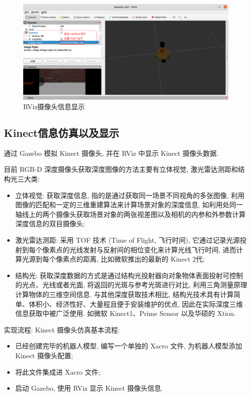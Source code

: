 \documentclass[openany, fontset=windowsold]{ctexbook}
\theoremstyle{kaiti}
\theoremstyle{normal}
\begin{document}
\begin{figure}[!ht]
  \centering
  \includegraphics[width=.9\textwidth]{rviz_show_camera_data.png}
  \caption{RViz摄像头信息显示}
  \label{fig:rviz_show_camera_data}
\end{figure}

\subsection{Kinect信息仿真以及显示}

通过 Gazebo 模拟 Kinect 摄像头, 并在 RViz 中显示 Kinect 摄像头数据.

目前 RGB-D 深度摄像头获取深度图像的方法主要有立体视觉, 激光雷达测距和结构光三大类:

\begin{itemize}
  \item 立体视觉: 获取深度信息, 指的是通过获取同一场景不同视角的多张图像, 利用图像的匹配和一定的三维重建算法来计算场景对象的深度信息, 如利用处同一轴线上的两个摄像头获取场景对象的两张视差图以及相机的内参和外参数计算深度信息的双目摄像头;
  \item 激光雷达测距: 采用 TOF 技术 (Time of Flight, 飞行时间), 它通过记录光源投射到每个像素点的光线发射与反射间的相位变化来计算光线飞行时间, 进而计算光源到每个像素点的距离, 比如微软推出的最新的 Kinect 2代;
  \item 结构光: 获取深度数据的方式是通过结构光投射器向对象物体表面投射可控制的光点、光线或者光面, 将返回的光斑与参考光斑进行对比, 利用三角测量原理计算物体的三维空间信息. 与其他深度获取技术相比, 结构光技术具有计算简单、体积小、经济性好、大量程且便于安装维护的优点, 因此在实际深度三维信息获取中被广泛使用. 如微软 Kinect1、Prime Sensor 以及华硕的 Xtion.
\end{itemize}

实现流程: Kinect 摄像头仿真基本流程:

\begin{itemize}
  \item 已经创建完毕的机器人模型, 编写一个单独的 Xacro 文件, 为机器人模型添加 Kinect 摄像头配置; 
  \item 将此文件集成进 Xacro 文件; 
  \item 启动 Gazebo, 使用 RViz 显示 Kinect 摄像头信息.
\end{itemize}
\end{document}
